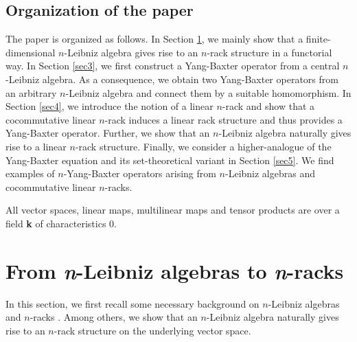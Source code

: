 \documentclass[a4paper,reqno,10pt]{amsart}
\theoremstyle{plain}
\theoremstyle{definition}
\theoremstyle{remark}
\begin{document}
\subsection{Organization of the paper} The paper is organized as follows. In Section \ref{sec2}, we mainly show that a finite-dimensional $n$-Leibniz algebra gives rise to an $n$-rack structure in a functorial way. In Section \ref{sec3}, we first construct a Yang-Baxter operator from a central $n$-Leibniz algebra. As a consequence, we obtain two Yang-Baxter operators from an arbitrary $n$-Leibniz algebra and connect them by a suitable homomorphism. In Section \ref{sec4}, we introduce the notion of a linear $n$-rack and show that a cocommutative linear $n$-rack induces a linear rack structure and thus provides a Yang-Baxter operator. Further, we show that an $n$-Leibniz algebra naturally gives rise to a linear $n$-rack structure. Finally, we consider a higher-analogue of the Yang-Baxter equation and its set-theoretical variant in Section \ref{sec5}. We find examples of $n$-Yang-Baxter operators arising from $n$-Leibniz algebras and cocommutative linear $n$-racks.

\medskip

All vector spaces, linear maps, multilinear maps and tensor products are over a field {\bf k} of characteristics $0$.








\section{From {\em n}-Leibniz algebras to {\em n}-racks}\label{sec2}
In this section, we first recall some necessary background on $n$-Leibniz algebras \cite{casas1} and $n$-racks \cite{biyog}. Among others, we show that an $n$-Leibniz algebra naturally gives rise to an $n$-rack structure on the underlying vector space.
\end{document}
